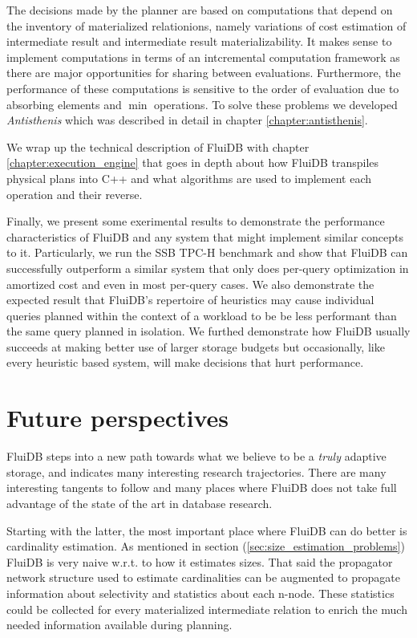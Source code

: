 The decisions made by the planner are based on computations that
depend on the inventory of materialized relationions, namely
variations of cost estimation of intermediate result and intermediate
result materializability. It makes sense to implement computations in
terms of an intcremental computation framework as there are major
opportunities for sharing between evaluations. Furthermore, the
performance of these computations is sensitive to the order of
evaluation due to absorbing elements and \(\min\) operations. To solve
these problems we developed \emph{Antisthenis} which was described in
detail in chapter \ref{chapter:antisthenis}.

We wrap up the technical description of FluiDB with chapter
\ref{chapter:execution_engine} that goes in depth about how FluiDB
transpiles physical plans into C++ and what algorithms are used to
implement each operation and their reverse.

Finally, we present some exerimental results to demonstrate the
performance characteristics of FluiDB and any system that might
implement similar concepts to it. Particularly, we run the SSB TPC-H
benchmark and show that FluiDB can successfully outperform a similar
system that only does per-query optimization in amortized cost and
even in most per-query cases. We also demonstrate the expected result
that FluiDB's repertoire of heuristics may cause individual queries
planned within the context of a workload to be be less performant than
the same query planned in isolation. We furthed demonstrate how FluiDB
usually succeeds at making better use of larger storage budgets but
occasionally, like every heuristic based system, will make decisions
that hurt performance.

\section{Future perspectives}

FluiDB steps into a new path towards what we believe to be a
\emph{truly} adaptive storage, and indicates many interesting research
trajectories. There are many interesting tangents to follow and many
places where FluiDB does not take full advantage of the state of the
art in database research.

Starting with the latter, the most important place where FluiDB can do
better is cardinality estimation. As mentioned in section
(\ref{sec:size_estimation_problems}) FluiDB is very naive w.r.t. to
how it estimates sizes. That said the propagator network structure
used to estimate cardinalities can be augmented to propagate
information about selectivity and statistics about each n-node. These
statistics could be collected for every materialized intermediate
relation to enrich the much needed information available during
planning.

